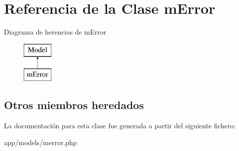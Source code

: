 \hypertarget{classm_error}{}\section{Referencia de la Clase m\+Error}
\label{classm_error}
Diagrama de herencias de m\+Error\begin{figure}[H]
\begin{center}
\leavevmode
\includegraphics[height=2.000000cm]{classm_error}
\end{center}
\end{figure}
\subsection*{Otros miembros heredados}


La documentación para esta clase fue generada a partir del siguiente fichero\+:\begin{DoxyCompactItemize}
\item 
app/models/merror.\+php\end{DoxyCompactItemize}
